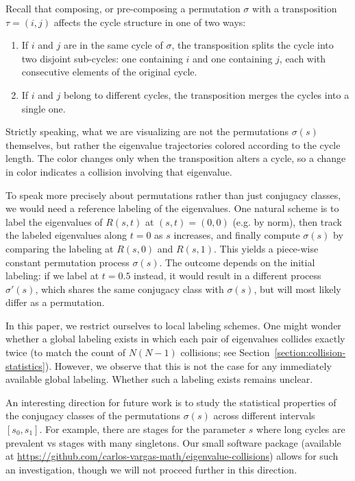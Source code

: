 \documentclass{article}
\begin{document}
	Recall that composing, or pre-composing a permutation $\sigma$ with a transposition $\tau = (i,j)$ 
	affects the cycle structure in one of two ways:
	\begin{enumerate}
		\item If $i$ and $j$ are in the same cycle of $\sigma$, the transposition splits 
		the cycle into two disjoint sub-cycles: one containing $i$ and one containing $j$, 
		each with consecutive elements of the original cycle.
		\item If $i$ and $j$ belong to different cycles, 
		the transposition merges the cycles into a single one.
	\end{enumerate}

	Strictly speaking, what we are visualizing are not the permutations $\sigma(s)$ themselves, 
	but rather the eigenvalue trajectories colored according to the cycle length. 
	The color changes only when the transposition alters a cycle, 
	so a change in color indicates a collision involving that eigenvalue.

	To speak more precisely about permutations rather than just conjugacy classes, 
	we would need a reference labeling of the eigenvalues. 
	One natural scheme is to label the eigenvalues of $R(s,t)$ at $(s,t) = (0,0)$ (e.g. by norm), 
	then track the labeled eigenvalues along $t=0$ as $s$ increases, 
	and finally compute $\sigma(s)$ by comparing the labeling at $R(s,0)$ and $R(s,1)$. 
	This yields a piece-wise constant permutation process $\sigma(s)$. 
	The outcome depends on the initial labeling: 
	if we label at $t=0.5$ instead, it would result in a different process $\sigma'(s)$, 
	which shares the same conjugacy class with $\sigma(s)$, but will most likely 
	differ as a permutation.

	In this paper, we restrict ourselves to local labeling schemes. 
	One might wonder whether a global labeling exists in which each pair of eigenvalues collides 
	exactly twice (to match the count of $N(N-1)$ collisions; 
	see Section~\ref{section:collision-statistics}). 
	However, we observe that this is not the case for any immediately available global labeling. 
	Whether such a labeling exists remains unclear.

	An interesting direction for future work is to study the statistical properties 
	of the conjugacy classes of the permutations $\sigma(s)$ across different intervals 
	$[s_0, s_1]$. For example, there are stages for the parameter $s$ where long cycles are prevalent
	vs stages with many singletons. 
	Our small software package 
	(available at \url{https://github.com/carlos-vargas-math/eigenvalue-collisions}) 
	allows for such an investigation, 
	though we will not proceed further in this direction.
\end{document}
